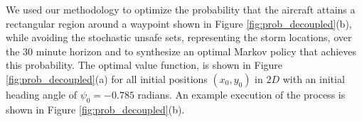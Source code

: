                  We used our methodology to optimize the probability
                 that the aircraft attains a rectangular region around
                 a waypoint shown in Figure
                 \ref{fig:prob_decoupled}(b), while avoiding the
                 stochastic unsafe sets, representing the storm
                 locations, over the $30$ minute horizon and to
                 synthesize an optimal Markov policy that achieves
                 this probability. The optimal value function, is
                 shown in Figure \ref{fig:prob_decoupled}(a) for all
                 initial positions $(x_0,y_0)$ in $2D$ with an initial
                 heading angle of $\psi_0 = -0.785$ radians. An
                 example execution of the process is shown in Figure
                 \ref{fig:prob_decoupled}(b).
                 \begin{figure}
                   \begin{center}
                     \begin{subfigmatrix}{2}

\end{subfigmatrix}
\end{center}
\end{figure}
